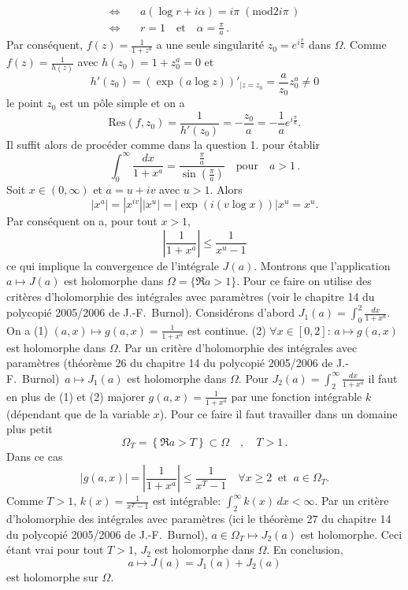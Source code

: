 {\begin{enumerate}
{$$\begin{aligned}
\Longleftrightarrow \quad & a(\log r +i \alpha ) = i\pi \; (\mathrm{mod} 2i\pi \, ) \\
\Longleftrightarrow\quad & r=1 \quad \text{et} \quad \alpha =\frac{\pi}{a}\, .
\end{aligned}$$
Par cons\'equent, $f(z)=\frac{1}{1+z^a}$ a une seule singularit\'e $z_0= e^{i\frac{\pi}{a}}$ dans $\Omega$.
Comme $f(z)=\frac{1}{h(z)}$ avec $h(z_0)=1+z_0^a =0$ et
$$h'(z_0)=\left(  \exp (a\log z)\right)'_{|z=z_0}=\frac{a}{z_0}z_0^a \neq 0$$
le point $z_0$ est un p\^ole simple et on a
$$\mathrm{Res} (f,z_0) =\frac{1}{h'(z_0)} =-\frac{z_0}{a} = -\frac{1}{a} e^{i\frac{\pi}{a}}.$$
Il suffit alors de proc\'eder comme dans la question 1. pour \'etablir
$$\int_0^\infty \frac{dx}{1+x^a}=\frac{\frac{\pi}{a}}{\sin\left(\frac{\pi}{a}\right)} \quad \text{pour} \quad a>1\, .$$
Soit $x\in(0,\infty )$ et $a=u+iv$ avec $u>1$. Alors
$$|x^a|=|x^{iv}||x^u|=|\exp \left( i(v\log x)\right)|x^u =x^u.$$
Par cons\'equent on a, pour tout $x>1$,
$$\left| \frac{1}{1+x^a}\right|\leq  \frac{1}{x^u-1}$$
ce qui implique la convergence de l'int\'egrale $J(a)$.
Montrons que l'application $a\mapsto J(a)$ est holomorphe dans $\Omega=\{ \Re a >1\}$.
Pour ce faire on utilise des critères d'holomorphie des intégrales avec paramètres (voir le chapitre 14 du polycopi\'e 2005/2006 de J.-F.~Burnol).
Consid\'erons d'abord
$J_1(a)=\int_0^2 \frac{dx}{1+x^a}$. On a
(1) $(a,x)\mapsto g(a,x)=\frac{1}{1+x^a}$ est continue.
(2) $\forall x\in [0,2]$: $a\mapsto g(a,x)$ est holomorphe dans $\Omega$.
\noindent Par un critère d'holomorphie des intégrales avec paramètres  (th\'eor\`eme 26 du chapitre 14 du polycopi\'e 2005/2006 de J.-F.~Burnol)\, $a\mapsto J_1(a)$ est holomorphe dans $\Omega$.
Pour $J_2(a)=\int_2^\infty \frac{dx}{1+x^a}$ il faut en plus de (1) et (2) majorer
$g(a,x)=\frac{1}{1+x^a}$ par une fonction int\'egrable $k$ (d\'ependant que de la variable $x$).
Pour ce faire il faut travailler dans un domaine plus petit
$$\Omega_T =\left\{ \Re a>T\right\} \subset \Omega \quad , \quad T>1\, .$$
Dans ce cas
$$|g(a,x)| = \left| \frac{1}{1+x^a} \right| \leq \frac{1}{x^T-1} \quad \forall x\geq 2 \;\; \text{et} \;\; a\in \Omega _T.$$
Comme $T>1$, $k(x)=\frac{1}{x^T-1}$ est int\'egrable: $\int _2^\infty k(x)\, dx <\infty$.
Par un critère d'holomorphie des intégrales avec paramètres (ici le th\'eor\`eme 27 du chapitre 14 du polycopi\'e 2005/2006 de J.-F.~Burnol), $a\in \Omega_T \mapsto J_2(a)$ est holomorphe.
Ceci \'etant vrai pour tout $T>1$, $J_2$ est holomorphe dans $\Omega$. En conclusion,
$$a \mapsto J(a)=J_1(a)+J_2(a)$$
est holomorphe sur $\Omega$.
}
\end{enumerate}}
